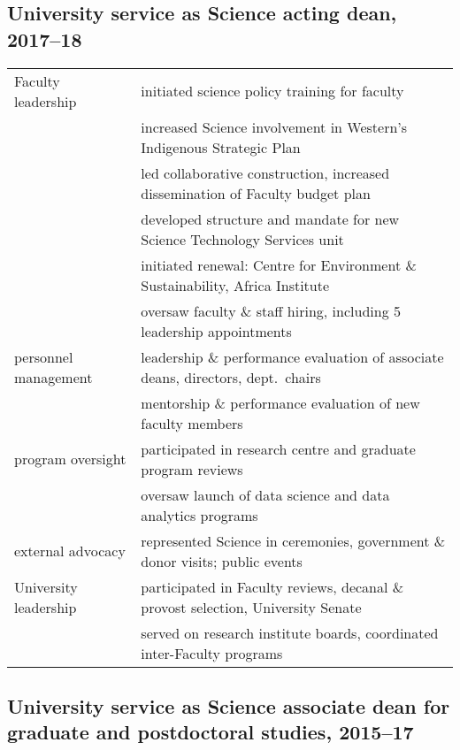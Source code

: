 \vspace{0.5cm}
\subsection{University service as Science acting dean, 2017--18}

\begin{tabularx}{\textwidth}{lX}
Faculty leadership & initiated science policy training for faculty \\
& increased Science involvement in Western's Indigenous Strategic Plan \\
& led collaborative construction, increased dissemination of Faculty budget plan\\
& developed structure and mandate for new Science Technology Services unit\\
& initiated renewal: Centre for Environment \& Sustainability, Africa Institute\\
& oversaw faculty \& staff hiring, including 5 leadership appointments \\
personnel management & leadership \& performance evaluation of associate deans, directors, dept.\ chairs\\
&mentorship  \& performance evaluation of new faculty members\\
program oversight & participated in research centre and graduate program reviews\\ 
& oversaw launch of data science and data analytics programs\\
external advocacy & represented Science in ceremonies, government \& donor visits; public events \\
University leadership  &  participated in Faculty reviews, decanal \& provost selection, University Senate \\
 & served on research institute boards, coordinated  inter-Faculty programs\\
\end{tabularx}


\vspace{0.5cm}
\subsection{University service as Science associate dean for graduate and postdoctoral studies, 2015--17}


